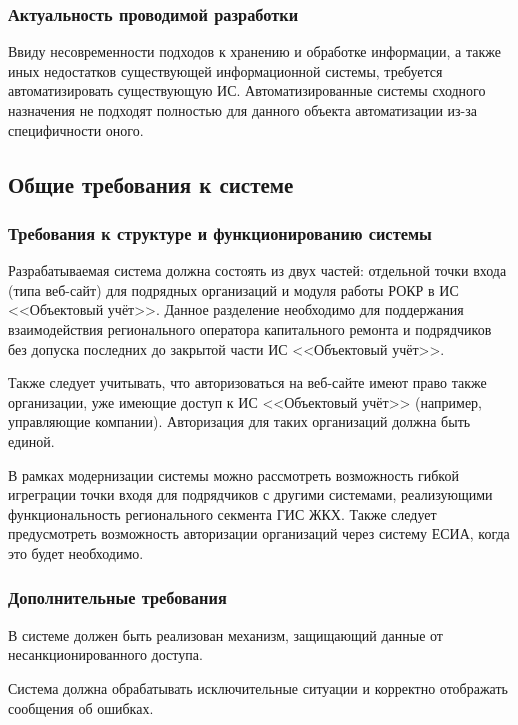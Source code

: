 \subsubsection{Актуальность проводимой разработки}

Ввиду несовременности подходов к хранению и обработке информации, а также иных недостатков существующей информационной системы, требуется автоматизировать существующую ИС.
Автоматизированные системы сходного назначения не подходят полностью для данного объекта автоматизации из-за специфичности оного.

\subsection{Общие требования к системе}

\subsubsection{Требования к структуре и функционированию системы}

Разрабатываемая система должна состоять из двух частей: отдельной точки входа (типа веб-сайт) для подрядных организаций и модуля работы РОКР в ИС <<Объектовый учёт>>.
Данное разделение необходимо для поддержания взаимодействия регионального оператора капитального ремонта и подрядчиков без допуска последних до закрытой части ИС <<Объектовый учёт>>.

Также следует учитывать, что авторизоваться на веб-сайте имеют право также организации, уже имеющие доступ к ИС <<Объектовый учёт>> (например, управляющие компании).
Авторизация для таких организаций должна быть единой.

В рамках модернизации системы можно рассмотреть возможность гибкой игреграции точки входя для подрядчиков с другими системами, реализующими функциональность регионального секмента ГИС ЖКХ.
Также следует предусмотреть возможность авторизации организаций через систему ЕСИА, когда это будет необходимо.

\subsubsection{Дополнительные требования}

В системе должен быть реализован механизм, защищающий данные от несанкционированного доступа.

Система должна обрабатывать исключительные ситуации и корректно отображать сообщения об ошибках.

